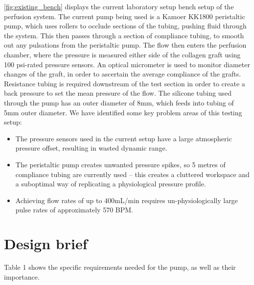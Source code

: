\documentclass[10pt, a4paper]{article}
\begin{document}
\autoref{fig:existing_bench} displays the current laboratory setup bench setup of the perfusion system. The current pump being used is a Kamoer KK1800 peristaltic pump, which uses rollers to occlude sections of the tubing, pushing fluid through the system. This then passes through a section of compliance tubing, to smooth out any pulsations from the peristaltic pump. The flow then enters the perfusion chamber, where the pressure is measured either side of the collagen graft using 100 psi-rated pressure sensors. An optical micrometer is used to monitor diameter changes of the graft, in order to ascertain the average compliance of the grafts. Resistance tubing is required downstream of the test section in order to create a back pressure to set the mean pressure of the flow. The silicone tubing used through the pump  has an outer diameter of 8mm, which feeds into tubing of 5mm outer diameter. We have identified some key problem areas of this testing setup:
\begin{itemize}[noitemsep]
    \item The pressure sensors used in the current setup have a large atmospheric pressure offset, resulting in wasted dynamic range.
    \item The peristaltic pump creates unwanted pressure spikes, so 5 metres of compliance tubing are currently used -- this creates a cluttered workspace and a suboptimal way of replicating a physiological pressure profile.
    \item Achieving flow rates of up to 400mL/min requires un-physiologically large pulse rates of approximately 570 BPM.
\end{itemize}

\section{Design brief}


Table 1 shows the specific requirements needed for the pump, as well as their importance.
\end{document}
